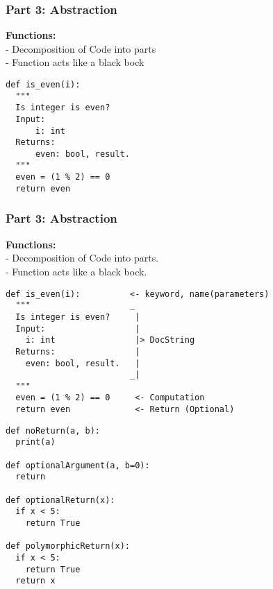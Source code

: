 \documentclass{beamer}
\begin{document}




\begin{frame}[fragile]
    \frametitle{\textbf{Part 3:} Abstraction}
    \textbf{Functions:}\\
    - Decomposition of Code into parts\\
    - Function acts like a black bock
    \begin{verbatim}
def is_even(i):
  """
  Is integer is even?
  Input:
      i: int
  Returns:
      even: bool, result.
  """
  even = (1 % 2) == 0
  return even
\end{verbatim}
\end{frame}

\begin{frame}[fragile]
    \frametitle{\textbf{Part 3:} Abstraction}
    \textbf{Functions:}\\
    - Decomposition of Code into parts.\\
    - Function acts like a black bock.
    \begin{verbatim}
def is_even(i):          <- keyword, name(parameters)
  """                    _
  Is integer is even?     |
  Input:                  |
    i: int                |> DocString
  Returns:                |
    even: bool, result.   |
                         _|
  """
  even = (1 % 2) == 0     <- Computation
  return even             <- Return (Optional)
    \end{verbatim}
\end{frame}


\begin{frame}[fragile]
    \begin{example}
\begin{verbatim}
def noReturn(a, b):
  print(a)

def optionalArgument(a, b=0):
  return

def optionalReturn(x):
  if x < 5:
    return True

def polymorphicReturn(x):
  if x < 5:
    return True
  return x
\end{verbatim}
    \end{example}
\end{frame}
\end{document}
